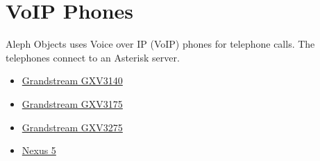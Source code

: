 %
%
%
%
%

\section{VoIP Phones}
Aleph Objects uses Voice over IP (VoIP) phones for telephone calls. 
The telephones connect to an Asterisk server.

\begin{itemize}
\item \href{https://www.grandstream.com/products/ip-video-telephony/gxv3140/}{Grandstream GXV3140}
\item \href{https://www.grandstream.com/products/ip-video-telephony/gxv3175/}{Grandstream GXV3175}
\item \href{https://www.grandstream.com/products/ip-video-telephony/gxv3275/}{Grandstream GXV3275}
\item \href{http://www.google.com/nexus/5/}{Nexus 5}
\end{itemize}

